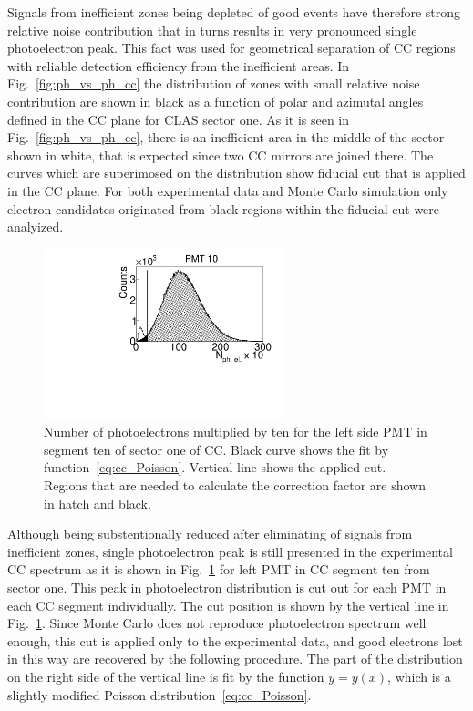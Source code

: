\documentclass[prc,twocolumn,superscriptaddress,showpacs,amssymb,amsmath,amsfonts,linenumbers,aps]{revtex4-1}
\begin{document}
Signals from inefficient zones being depleted of good events have therefore strong relative noise contribution that in turns results in very pronounced single photoelectron peak. This fact was used for geometrical separation of CC regions with reliable detection efficiency from the inefficient areas.  In Fig.~\ref{fig:ph_vs_ph_cc} the distribution of zones with small relative noise contribution are shown in black as a function of polar and azimutal angles defined in the CC plane for CLAS sector one. As it is seen in Fig.~\ref{fig:ph_vs_ph_cc}, there is an inefficient area in the middle of the sector shown in white, that is expected since two CC mirrors are joined there. The curves which are superimosed on the distribution  show fiducial cut that is applied in the CC plane. For both experimental data and Monte Carlo simulation only electron candidates originated from black regions within the fiducial cut were analyized.



\begin{figure}[htp]
\begin{center}
 \includegraphics[width=7cm,keepaspectratio]{pictures/electron_id/ph_el.pdf}
\vspace{-0.1cm}
\caption{Number of photoelectrons multiplied by ten for the left side PMT in segment ten of sector one of CC. Black curve shows the fit by function~\eqref{eq:cc_Poisson}. Vertical line shows the applied cut. Regions that are needed to calculate the correction factor are shown in hatch and black. }
\label{fig:ph_el}
\end{center}
\end{figure} 
 

 



Although being substentionally reduced after eliminating of signals from inefficient zones, single photoelectron peak is still presented in the experimental CC spectrum as it is shown in Fig.~\ref{fig:ph_el} for left PMT in CC segment ten from sector one. This peak in photoelectron distribution is cut out for each PMT in each CC segment individually. The cut position is shown by the vertical line in Fig.~\ref{fig:ph_el}.
Since Monte Carlo does not reproduce photoelectron spectrum well enough, this cut is applied only to the experimental data, and good electrons lost in this way are recovered by the following procedure. The part of the distribution on the right side of the vertical line is fit by the function $y = y(x)$, which is a slightly modified Poisson distribution~\eqref{eq:cc_Poisson}. 
\end{document}
